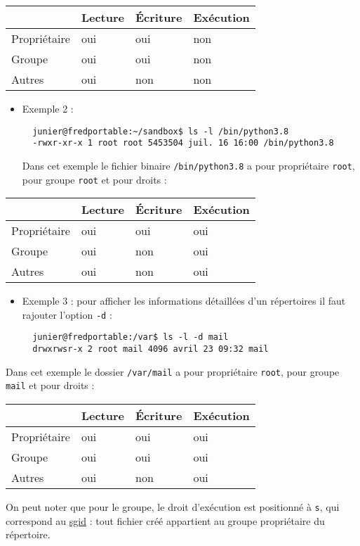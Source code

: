 \documentclass[
  11pt,
]{article}
\newcounter{prop}
\begin{document}
\begin{longtable}[]{@{}llll@{}}
\toprule
& Lecture & Écriture & Exécution\tabularnewline
\midrule
\endhead
Propriétaire & oui & oui & non\tabularnewline
Groupe & oui & oui & non\tabularnewline
Autres & oui & non & non\tabularnewline
\bottomrule
\end{longtable}

\begin{itemize}
\item
  Exemple 2 :

\begin{verbatim}
  junier@fredportable:~/sandbox$ ls -l /bin/python3.8
  -rwxr-xr-x 1 root root 5453504 juil. 16 16:00 /bin/python3.8
\end{verbatim}

  Dans cet exemple le fichier binaire \texttt{/bin/python3.8} a pour
  propriétaire \texttt{root}, pour groupe \texttt{root} et pour droits :
\end{itemize}

\begin{longtable}[]{@{}llll@{}}
\toprule
& Lecture & Écriture & Exécution\tabularnewline
\midrule
\endhead
Propriétaire & oui & oui & oui\tabularnewline
Groupe & oui & non & oui\tabularnewline
Autres & oui & non & oui\tabularnewline
\bottomrule
\end{longtable}

\begin{itemize}
\item
  Exemple 3 : pour afficher les informations détaillées d'un répertoires
  il faut rajouter l'option \texttt{-d} :

\begin{verbatim}
  junier@fredportable:/var$ ls -l -d mail
  drwxrwsr-x 2 root mail 4096 avril 23 09:32 mail
\end{verbatim}
\end{itemize}

Dans cet exemple le dossier \texttt{/var/mail} a pour propriétaire
\texttt{root}, pour groupe \texttt{mail} et pour droits :

\begin{longtable}[]{@{}llll@{}}
\toprule
& Lecture & Écriture & Exécution\tabularnewline
\midrule
\endhead
Propriétaire & oui & oui & oui\tabularnewline
Groupe & oui & oui & oui\tabularnewline
Autres & oui & non & oui\tabularnewline
\bottomrule
\end{longtable}

On peut noter que pour le groupe, le droit d'exécution est positionné à
\texttt{s}, qui correspond au
\href{https://fr.wikipedia.org/wiki/Permissions_UNIX\#Droit_SGID}{sgid}
: tout fichier créé appartient au groupe propriétaire du répertoire.
\end{document}
